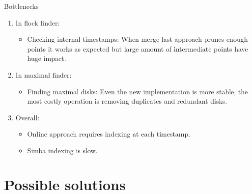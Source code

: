 \documentclass{beamer}
\theoremstyle{definition}
\begin{document}
\begin{frame}{Bottlenecks}
    \begin{enumerate}
        \item In flock finder:
            \begin{itemize}
                \item Checking internal timestamps: When merge last approach prunes enough points it works as expected but large amount of intermediate points have huge impact. 
            \end{itemize}
        \item In maximal finder:
            \begin{itemize}
                \item Finding maximal disks: Even the new implementation is more stable, the most costly operation is removing duplicates and redundant disks.
            \end{itemize}
        \item Overall:
            \begin{itemize}
             \item Online approach requires indexing at each timestamp.
             \item Simba indexing is slow.
            \end{itemize}
    \end{enumerate}
\end{frame}

\section{Possible solutions}
\end{document}
